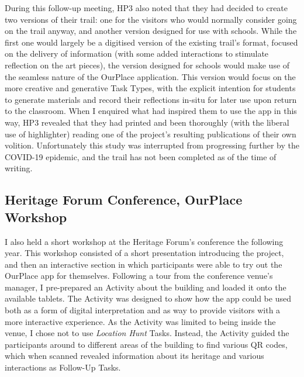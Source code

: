 During this follow-up meeting, HP3 also noted that they had decided to create two versions of their trail: one for the visitors who would normally consider going on the trail anyway, and another version designed for use with schools. While the first one would largely be a digitised version of the existing trail's format, focused on the delivery of information (with some added interactions to stimulate reflection on the art pieces), the version designed for schools would make use of the seamless nature of the OurPlace application. This version would focus on the more creative and generative Task Types, with the explicit intention for students to generate materials and record their reflections in-situ for later use upon return to the classroom. When I enquired what had inspired them to use the app in this way, HP3 revealed that they had printed and been thoroughly (with the liberal use of highlighter) reading one of the project's resulting publications \citep{Richardson2018} of their own volition. Unfortunately this study was interrupted from progressing further by the COVID-19 epidemic, and the trail has not been completed as of the time of writing.

\subsection{Heritage Forum Conference, OurPlace Workshop}
\label{app:HeritageOurPlaceWorkshop}

I also held a short workshop at the Heritage Forum's conference the following year. This workshop consisted of a short presentation introducing the project, and then an interactive section in which participants were able to try out the OurPlace app for themselves. Following a tour from the conference venue's manager, I pre-prepared an Activity about the building and loaded it onto the available tablets. The Activity was designed to show how the app could be used both as a form of digital interpretation and as way to provide visitors with a more interactive experience. As the Activity was limited to being inside the venue, I chose not to use \textit{Location Hunt} Tasks. Instead, the Activity guided the participants around to different areas of the building to find various QR codes, which when scanned revealed information about its heritage and various interactions as Follow-Up Tasks.

